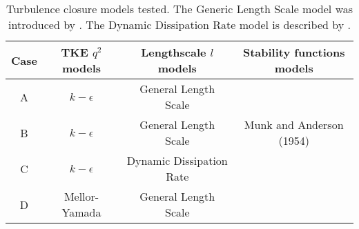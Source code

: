 
\begin{table}[t]
\caption{Turbulence closure models tested. The Generic Length Scale model was introduced by  \textcite{Umlauf:2003p6143}. The Dynamic Dissipation Rate model is described by \textcite{RODI:1987p6154}.}
\label{table2}
\begin{center}
\begin{tabular}{cccc}
\hline\hline
 Case & TKE $q^2$ models & Lengthscale $l$ models & Stability functions models \\
\hline
 A & $k-\epsilon$ & General Length Scale & \textcite{SCHUMANN:1995p6133} \\
 B & $k-\epsilon$ & General Length Scale & Munk and Anderson (1954) \\
 C & $k-\epsilon$ & Dynamic Dissipation Rate & \textcite{SCHUMANN:1995p6133} \\
 D & Mellor-Yamada & General Length Scale & \textcite{SCHUMANN:1995p6133} \\
\hline
\end{tabular}
\end{center}
\end{table}


